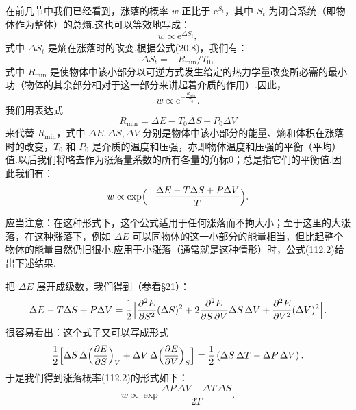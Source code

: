 在前几节中我们已经看到，涨落的概率 $w$ 正比于 $\mathrm{e}^{S_{t}}$，其中 $S_{t}$
为闭合系统（即物体作为整体）的总熵.这也可以等效地写成：
\begin{equation*}
  w\propto\mathrm{e}^{\Delta S_{t}},
\end{equation*}
式中 $\Delta S_{t}$ 是熵在涨落时的改变.根据公式(20.8)，我们有：
\begin{equation*}
  \Delta S_{t}=-R_{\min}/T_{0},
\end{equation*}
式中 $R_{\min}$ 是使物体中该小部分以可逆方式发生给定的热力学量改变所必需的最小功（物体的其余部分相对于这一部分来讲起着介质的作用）.因此，
\begin{equation}
  w\propto\mathrm{e}^{-\frac{R_{\min}}{T_{0}}}.
\end{equation}
我们用表达式
\begin{equation*}
  R_{\min}=\Delta E-T_{0}\Delta S+P_{0}\Delta V
\end{equation*}
来代替 $R_{\min}$，式中 $\Delta E,\Delta S,\Delta V$ 分别是物体中该小部分的能量、熵和体积在涨落时的改变，$T_{0}$ 和 $P_{0}$ 是介质的温度和压强，亦即物体温度和压强的平衡（平均）值.以后我们将略去作为涨落量系数的所有各量的角标0；总是指它们的平衡值.因此我们有：
\begin{equation}
  w\propto\exp\Bigl(-\frac{\Delta E-T\Delta S+P\Delta V}{T}\Bigr).
\end{equation}

应当注意：在这种形式下，这个公式适用于任何涨落而不拘大小；至于这里的大涨落，在这种涨落下，例如 $\Delta E$ 可以同物体的这一小部分的能量相当，但比起整个物体的能量自然仍旧很小.应用于小涨落（通常就是这种情形）时，公式(112.2)给出下述结果.

把 $\Delta E$ 展开成级数，我们得到（参看§21）：
\begin{equation*}
  \Delta E-T\Delta S+P\Delta V=\frac{1}{2}\Bigl[
  \frac{\partial^{2}E}{\partial S^{2}}(\Delta S)^{2}
  +2\frac{\partial^{2}E}{\partial S\,\partial V}\Delta S\,\Delta V
  +\frac{\partial^{2}E}{\partial V^{2}}(\Delta V)^{2}\Bigr].
\end{equation*}
很容易看出：这个式子又可以写成形式
\begin{equation*}
  \frac{1}{2}\Bigl[\Delta S\,\Delta\Bigl(\frac{\partial E}{\partial S}\Bigr)_{V}
  +\Delta V\,\Delta\Bigl(\frac{\partial E}{\partial V}\Bigr)_{S}\Bigr]
  =\frac{1}{2}\left(\Delta S\,\Delta T-\Delta P\,\Delta V\right).
\end{equation*}
于是我们得到涨落概率(112.2)的形式如下：
\begin{equation}
  w\propto\exp\frac{\Delta P\,\Delta V-\Delta T\,\Delta S}{2T}.
\end{equation}

